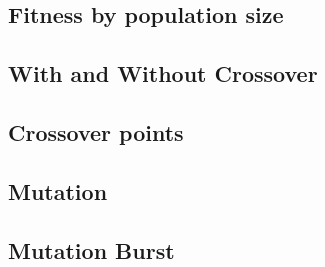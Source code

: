 \documentclass[a4paper]{article}
\begin{document}
\subsection{Fitness by population size}
\label{sec:fitness_by_population_size}


\subsection{With and Without Crossover}
\label{sec:crossover_on_off}


\subsection{Crossover points}
\label{sec:crossover_points}


\eject \pdfpagewidth=420.0mm \pdfpageheight=297.0mm

\subsection{Mutation}
\label{sec:mutation}


\subsection{Mutation Burst}
\label{sec:mutation_burst}

\end{document}
